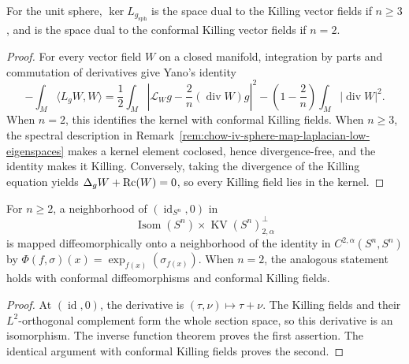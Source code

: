 \begin{lemma}
\label{lem:chow-iv-sphere-map-laplacian-kernel}


For the unit sphere, \(\ker L_{g_{\mathrm{sph}}}\) is the space dual to the
Killing vector fields if \(n\ge3\), and is the space dual to the conformal
Killing vector fields if \(n=2\).
\end{lemma}
\begin{proof}
\sketch
For every vector field \(W\) on a closed manifold, integration by parts and
commutation of derivatives give Yano's identity
\[
 -\int_M\langle L_gW,W\rangle
 =\frac12\int_M\left|\mathcal L_Wg-\frac2n(\operatorname{div}W)g\right|^2
  -\left(1-\frac2n\right)\int_M|\operatorname{div}W|^2.
\]
When \(n=2\), this identifies the kernel with conformal Killing fields.  When
\(n\ge3\), the spectral description in Remark~\ref{rem:chow-iv-sphere-map-laplacian-low-eigenspaces}
makes a kernel element coclosed, hence divergence-free, and the identity makes
it Killing.  Conversely, taking the divergence of the Killing equation yields
\(\Delta_gW+\operatorname{Rc}(W)=0\), so every Killing field lies in the kernel.
\end{proof}

\begin{lemma}
\label{lem:chow-iv-sphere-maps-near-identity-parametrization}

For \(n\ge2\), a neighborhood of \((\operatorname{id}_{S^n},0)\) in
\[
 \operatorname{Isom}(S^n)\times\operatorname{KV}(S^n)_{2,\alpha}^{\perp}
\]
is mapped diffeomorphically onto a neighborhood of the identity in
\(C^{2,\alpha}(S^n,S^n)\) by
\(\Phi(f,\sigma)(x)=\exp_{f(x)}(\sigma_{f(x)})\).  When \(n=2\), the analogous
statement holds with conformal diffeomorphisms and conformal Killing fields.
\end{lemma}
\begin{proof}
\sketch
At \((\operatorname{id},0)\), the derivative is
\((\tau,\nu)\mapsto\tau+\nu\).  The Killing fields and their \(L^2\)-orthogonal
complement form the whole section space, so this derivative is an isomorphism.
The inverse function theorem proves the first assertion.  The identical
argument with conformal Killing fields proves the second.
\end{proof}

